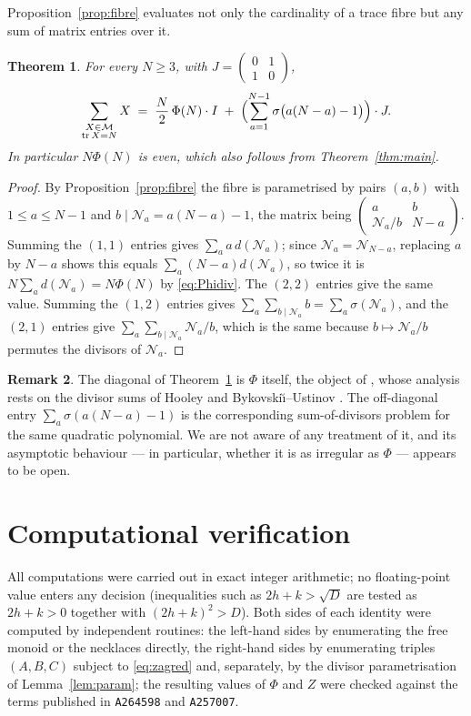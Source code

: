 \documentclass[11pt,reqno]{amsart}
\theoremstyle{plain}
\newtheorem{theorem}{Theorem}[section]
\theoremstyle{definition}
\newtheorem{remark}[theorem]{Remark}
\newcommand{\Mon}{\mathcal{M}}
\newcommand{\Nn}{\mathcal{N}}
\newcommand{\tr}{\operatorname{tr}}
\newcommand{\sqm}[4]{\left(\begin{smallmatrix}#1&#2\\#3&#4\end{smallmatrix}\right)}
\begin{document}
Proposition~\ref{prop:fibre} evaluates not only the cardinality of a trace fibre but any
sum of matrix entries over it.

\begin{theorem}\label{thm:total}
For every $N\ge3$, with $J=\sqm{0}{1}{1}{0}$,
\[
  \sum_{\substack{X\in\Mon\\ \tr X=N}}X
  \;=\;\frac{N}{2}\,\Phi(N)\cdot I\;+\;
  \Bigl(\sum_{a=1}^{N-1}\sigma\bigl(a(N-a)-1\bigr)\Bigr)\cdot J .
\]
In particular $N\Phi(N)$ is even, which also follows from Theorem~\ref{thm:main}.
\end{theorem}

\begin{proof}
By Proposition~\ref{prop:fibre} the fibre is parametrised by pairs $(a,b)$ with
$1\le a\le N-1$ and $b\mid \Nn_a=a(N-a)-1$, the matrix being
$\sqm{a}{b}{\Nn_a/b}{N-a}$. Summing the $(1,1)$ entries gives
$\sum_a a\,d(\Nn_a)$; since $\Nn_a=\Nn_{N-a}$, replacing $a$ by $N-a$ shows this equals
$\sum_a (N-a)d(\Nn_a)$, so twice it is $N\sum_a d(\Nn_a)=N\Phi(N)$ by \eqref{eq:Phidiv}.
The $(2,2)$ entries give the same value. Summing the $(1,2)$ entries gives
$\sum_a\sum_{b\mid \Nn_a}b=\sum_a\sigma(\Nn_a)$, and the $(2,1)$ entries give
$\sum_a\sum_{b\mid \Nn_a}\Nn_a/b$, which is the same because $b\mapsto \Nn_a/b$ permutes
the divisors of $\Nn_a$.
\end{proof}

\begin{remark}
The diagonal of Theorem~\ref{thm:total} is $\Phi$ itself, the object of
\cite{KO,KOPS,Boca,Ustinov,Technau}, whose analysis rests on the divisor sums of Hooley
\cite{Hooley} and Bykovski\u\i--Ustinov \cite{BU}. The off-diagonal entry
$\sum_{a}\sigma(a(N-a)-1)$ is the corresponding sum-of-divisors problem for the same
quadratic polynomial. We are not aware of any treatment of it, and its asymptotic
behaviour --- in particular, whether it is as irregular as $\Phi$ --- appears to be open.
\end{remark}

\section{Computational verification}\label{sec:verify}

All computations were carried out in exact integer arithmetic; no floating-point value
enters any decision (inequalities such as $2h+k>\sqrt D$ are tested as
$2h+k>0$ together with $(2h+k)^2>D$). Both sides of each identity were computed by
independent routines: the left-hand sides by enumerating the free monoid or the
necklaces directly, the right-hand sides by enumerating triples $(A,B,C)$ subject to
\eqref{eq:zagred} and, separately, by the divisor parametrisation of
Lemma~\ref{lem:param}; the resulting values of $\Phi$ and $Z$ were checked against the
terms published in \texttt{A264598} and \texttt{A257007}.
\end{document}
